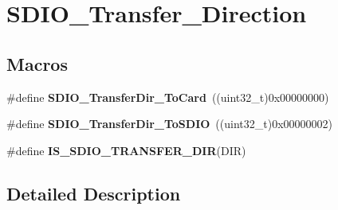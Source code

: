 \hypertarget{group___s_d_i_o___transfer___direction}{\section{S\-D\-I\-O\-\_\-\-Transfer\-\_\-\-Direction}
\label{group___s_d_i_o___transfer___direction}
}
\subsection*{Macros}
\begin{DoxyCompactItemize}
\item 
\hypertarget{group___s_d_i_o___transfer___direction_gaef8af0ffa4ea04b3362338d268cc0935}{\#define {\bfseries S\-D\-I\-O\-\_\-\-Transfer\-Dir\-\_\-\-To\-Card}~((uint32\-\_\-t)0x00000000)}\label{group___s_d_i_o___transfer___direction_gaef8af0ffa4ea04b3362338d268cc0935}

\item 
\hypertarget{group___s_d_i_o___transfer___direction_ga55a6d9613d3e2e7762296b45d0d13222}{\#define {\bfseries S\-D\-I\-O\-\_\-\-Transfer\-Dir\-\_\-\-To\-S\-D\-I\-O}~((uint32\-\_\-t)0x00000002)}\label{group___s_d_i_o___transfer___direction_ga55a6d9613d3e2e7762296b45d0d13222}

\item 
\#define {\bfseries I\-S\-\_\-\-S\-D\-I\-O\-\_\-\-T\-R\-A\-N\-S\-F\-E\-R\-\_\-\-D\-I\-R}(D\-I\-R)
\end{DoxyCompactItemize}


\subsection{Detailed Description}



